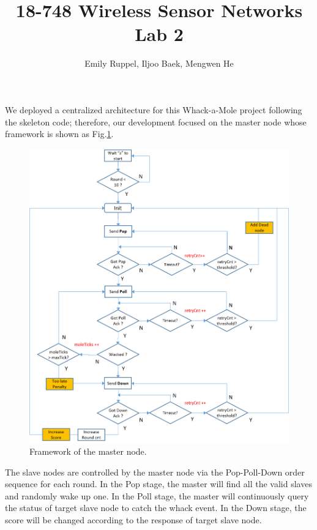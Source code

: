 \documentclass[letterpaper, 10pt]{article}
\title{\textbf{18-748 Wireless Sensor Networks Lab 2}}
\author{Emily Ruppel, Iljoo Baek, Mengwen He}
\begin{document}
	\maketitle
	
We deployed a centralized architecture for this Whack-a-Mole project following the skeleton code; therefore, our development focused on the master node whose framework is shown as Fig.\ref{fig:framework}.

\begin{figure}[!h]
	\centering
	\includegraphics[width=13cm]{./frame.png}
	\caption{Framework of the master node.}
	\label{fig:framework}
\end{figure}

The slave nodes are controlled by the master node via the Pop-Poll-Down order sequence for each round. In the Pop stage, the master will find all the valid slaves and randomly wake up one. In the Poll stage, the master will continuously query the status of target slave node to catch the whack event. In the Down stage, the score will be changed according to the response of target slave node.
\end{document}
